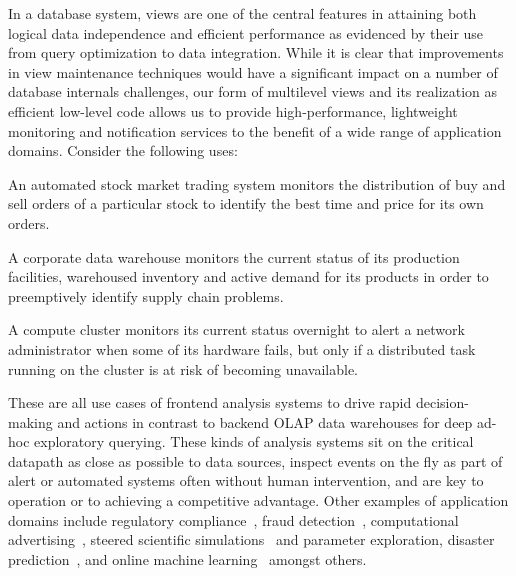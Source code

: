 
In a database system, views are one of the central features in attaining both
logical data independence and efficient performance as evidenced by their use
from query optimization to data integration. While it is clear that improvements
in view maintenance techniques would have a significant impact on a number of
database internals challenges, our form of multilevel views and its realization
as efficient low-level code allows us to provide high-performance, lightweight
monitoring and notification services to the benefit of a wide range of
application domains. Consider the following uses:

\begin{list}{}{ \leftmargin=1em}
\addtolength{\itemsep}{-0.5\baselineskip}
\item An automated stock market trading system monitors the distribution of buy
and sell orders of a particular stock to identify the best time and price for
its own orders.

\item A corporate data warehouse monitors the current status of its production
facilities, warehoused inventory and active demand for its products in order to
preemptively identify supply chain problems.

\item A compute cluster monitors its current status overnight to alert a network
administrator when some of its hardware fails, but only if a distributed task
running on the cluster is at risk of becoming unavailable.
\end{list}

These are all use cases of frontend analysis systems to drive rapid
decision-making and actions in contrast to backend OLAP data warehouses for deep
ad-hoc exploratory querying. These kinds of analysis systems sit on the critical
datapath as close as possible to data sources, inspect events on the fly as part
of alert or automated systems often without human intervention, and are key to
operation or to achieving a competitive advantage. Other examples of application
domains include regulatory compliance~\cite{basel2}, fraud
detection~\cite{ibmfico}, computational
advertising~\cite{agarwal2010forecasting}, steered scientific
simulations~\cite{hey2009fourth} and parameter exploration, disaster
prediction~\cite{scholz1973earthquake}, and online machine
learning~\cite{olesen2008real} amongst others.


